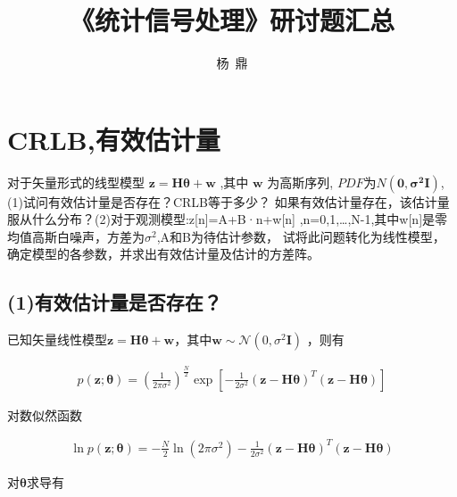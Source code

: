 \documentclass[fontset=windows]{article}
\title{\heiti\zihao{2} 《统计信号处理》研讨题汇总}
\author{杨\ 鼎}
\date{}
\numberwithin{figure}{section}
\begin{document}
\maketitle
\thispagestyle{empty}


\tableofcontents
\setcounter{page}{0}
\newpage

\section{CRLB,有效估计量}
对于矢量形式的线型模型 \(\mathbf{z=H}\boldsymbol{\theta}+\mathbf{w}\) ,其中 \(\mathbf{w}\) 为高斯序列,
\(PDF\)为\(N(\mathbf{0,\sigma^2I})\),(1)试问有效估计量是否存在？CRLB等于多少？
如果有效估计量存在，该估计量服从什么分布？(2)对于观测模型:z[n]=A+B·n+w[n]
,n=0,1,…,N-1,其中w[n]是零均值高斯白噪声，方差为\(\sigma^2\),A和B为待估计参数，
试将此问题转化为线性模型，确定模型的各参数，并求出有效估计量及估计的方差阵。

\subsection*{(1)有效估计量是否存在？}

已知矢量线性模型\(\mathbf{z=H}\boldsymbol{\theta}+\mathbf{w}\)，其中\(\mathbf{w}\sim \mathcal{N} (0,\sigma^2 \mathbf{I})\)
，则有

\begin{align*}
    p(\mathbf{z};\boldsymbol{\theta})=(\frac{1}{2\pi \sigma^2})^{\frac{N}{2}}
    \exp\left[-\frac{1}{2\sigma^2}(\mathbf{z-H\boldsymbol{\theta}})^T
        (\mathbf{z-H\boldsymbol{\theta}})\right]
\end{align*}

对数似然函数

\begin{align*}
    \ln p(\mathbf{z};\boldsymbol{\theta})=-{\frac{N}{2}}\ln (2\pi \sigma^2)
    -\frac{1}{2\sigma^2}(\mathbf{z-H}\boldsymbol{\theta})^T(\mathbf{z-H}\boldsymbol{\theta})
\end{align*}

对\(\boldsymbol{\theta}\)求导有
\end{document}
